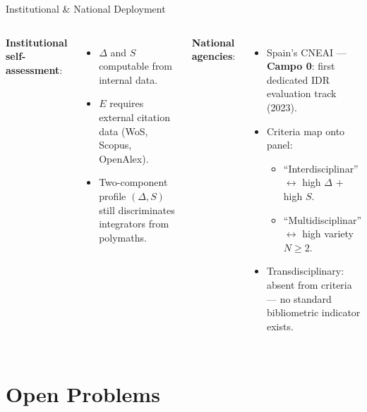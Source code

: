 \documentclass[aspectratio=169,10pt]{beamer}
\begin{document}
\begin{frame}{Institutional \& National Deployment}
\begin{columns}[T]
\textbf{Institutional self-assessment}:
\begin{itemize}
  \item $\Delta$ and $S$ computable from internal data.
  \item $E$ requires external citation data (WoS, Scopus, OpenAlex).
  \item Two-component profile $(\Delta, S)$ still discriminates
        integrators from polymaths.
\end{itemize}

\textbf{National agencies}:
\begin{itemize}
  \item Spain's CNEAI --- \textbf{Campo 0}: first dedicated IDR
        evaluation track (2023).
  \item Criteria map onto panel:
  \begin{itemize}\footnotesize
    \item ``Interdisciplinar'' $\leftrightarrow$ high $\Delta$ + high $S$.
    \item ``Multidisciplinar'' $\leftrightarrow$ high variety $N \geq 2$.
  \end{itemize}
  \item Transdisciplinary: absent from criteria ---
        no standard bibliometric indicator exists.
\end{itemize}
\end{columns}
\end{frame}

\section{Open Problems}
\end{document}
